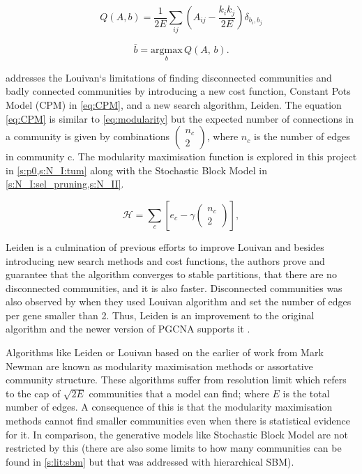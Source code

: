 \begin{equation} \label{eq:mod_max_cost}
    Q(A,b) = \frac{1}{2E} \sum_{ij} \left( A_{ij} - \frac{k_i k_j}{2E} \right) \delta_{b_i, b_j}
\end{equation}

\begin{equation} \label{eq:mod_max_per_com}
    \bar{b} = \underset{b}{\mathrm{argmax}} \, Q(A, \, b).
\end{equation}

\citet{Traag2019-ne} addresses the Louivan`s limitations of finding disconnected communities and badly connected communities by introducing a new cost function, Constant Pots Model (CPM) in \cref{eq:CPM}, and a new search algorithm, Leiden. The equation \cref{eq:CPM} is similar to \cref{eq:modularity} but the expected number of connections in a community is given by combinations $(\begin{array}{c}{n}_{c}\\ 2\end{array})$, where $n_c$ is the number of edges in community c. The modularity maximisation function is explored in this project in \cref{s:p0,s:N_I:tum} along with the Stochastic Block Model in \cref{s:N_I:sel_pruning,s:N_II}.

\begin{equation} \label{eq:CPM}
    {\mathcal H} ={\sum }_{c}[{e}_{c}-\gamma (\begin{array}{c}{n}_{c}\\ 2\end{array})],
\end{equation}

Leiden is a culmination of previous efforts to improve Louivan \citep{Ozaki2016-dl, Waltman2013-zw, Bae2017-rz, Traag2015-tq} and besides introducing new search methods and cost functions, the authors prove and guarantee that the algorithm converges to stable partitions, that there are no disconnected communities, and it is also faster. Disconnected communities was also observed by \citet{Care2019-ij} when they used Louivan algorithm and set the number of edges per gene smaller than 2. Thus, Leiden is an improvement to the original algorithm and the newer version of PGCNA supports it \citep{Care2019-ij} .

Algorithms like Leiden or Louivan based on the earlier of work from Mark Newman \citep{Newman2004-dd, Newman2006-fa} are known as modularity maximisation methods or assortative community structure. These algorithms suffer from resolution limit \citep{Fortunato2007-gh, Peixoto2021-jx} which refers to the cap of $\sqrt{2E}$ communities that a model can find; where $E$ is the total number of edges. A consequence of this is that the modularity maximisation methods cannot find smaller communities even when there is statistical evidence for it. In comparison, the generative models like Stochastic Block Model are not restricted by this (there are also some limits to how many communities can be found in \cref{s:lit:sbm} but that was addressed with hierarchical SBM).

